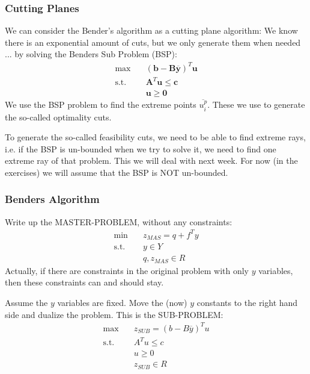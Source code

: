 \documentclass[fleqn,10pt]{wlscirep}
\begin{document}
\subsubsection{Cutting Planes}

We can consider the Bender’s algorithm as a cutting plane algorithm: We know there is an exponential amount of cuts, but we only generate them when needed ... by solving the Benders Sub Problem (BSP):
\begin{align}
    \max \quad& (\mathbf{b} - \mathbf{B} \mathbf{\overline{y}})^{T} \mathbf{u} \\
    \text{s.t.} \quad& \mathbf{A}^{T} \mathbf{u} \leq \mathbf{c} \\ 
    & \mathbf{u} \geq \mathbf{0}
\end{align}
We use the BSP problem to find the extreme points $\overline{u_i^p}$. These we use to generate the so-called optimality cuts.

To generate the so-called feasibility cuts, we need to be able to find extreme rays, i.e. if the BSP is un-bounded when we try to solve it, we need to find one extreme ray of that problem. This we will deal with next week. For now (in the exercises) we will assume that the BSP is NOT un-bounded.

\subsubsection{Benders Algorithm}

Write up the MASTER-PROBLEM, without any constraints:
\begin{align}
    \min \quad& z_{MAS} = q + f ^ { T } y \\
    \text{s.t.} \quad& y \in Y \\
    & q , z_{MAS} \in R
\end{align}
Actually, if there are constraints in the original problem with only $y$ variables, then these constraints can and should stay.

Assume the $y$ variables are fixed. Move the (now) $y$ constants to the right hand side and dualize the problem. This is the SUB-PROBLEM:
\begin{align}
    \max \quad & z_{SUB} = ( b - B \overline { y } ) ^ { T } u \\
    \text{s.t.} \quad & A ^ { T } u \leq c \\ 
    & u \geq 0 \\
    & z_{SUB} \in R
\end{align}
\end{document}
